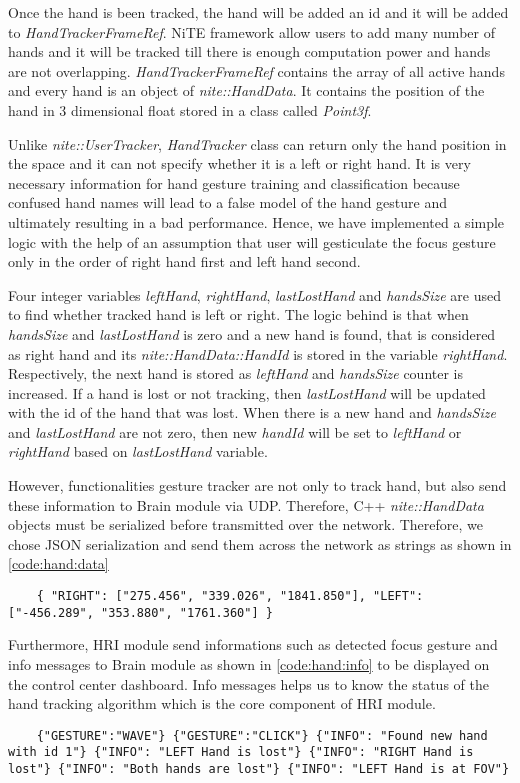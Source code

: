 Once the hand is been tracked, the hand will be added an id and it will be added to \textit{HandTrackerFrameRef}. NiTE framework allow users to add many number of hands and it will be tracked till there is enough computation power and hands are not overlapping. \textit{HandTrackerFrameRef} contains the array of all active hands and every hand is an object of \textit{nite::HandData}. It contains the position of the hand in 3 dimensional float stored in a class called \textit{Point3f}.

Unlike \textit{nite::UserTracker}, \textit{HandTracker} class can return only the hand position in the space and it can not specify whether it is a left or right hand. It is very necessary information for hand gesture training and classification because confused hand names will lead to a false model of the hand gesture and ultimately resulting in a bad performance. Hence, we have implemented a simple logic with the help of an assumption that user will gesticulate the focus gesture only in the order of right hand first and left hand second. 

Four integer variables \textit{leftHand}, \textit{rightHand}, \textit{lastLostHand} and \textit{handsSize} are used to find whether tracked hand is left or right. The logic behind is that when \textit{handsSize} and \textit{lastLostHand} is zero and a new hand is found, that is considered as right hand and its \textit{nite::HandData::HandId} is stored in the variable \textit{rightHand}. Respectively, the next hand is stored as \textit{leftHand} and \textit{handsSize} counter is increased. If a hand is lost or not tracking, then \textit{lastLostHand} will be updated with the id of the hand that was lost. When there is a new hand and \textit{handsSize} and \textit{lastLostHand} are not zero, then new \textit{handId} will be set to \textit{leftHand} or \textit{rightHand} based on \textit{lastLostHand} variable.

However, functionalities gesture tracker are not only to track hand, but also send these information to Brain module via UDP. Therefore, C++ \textit{nite::HandData} objects must be serialized before transmitted over the network. Therefore, we chose JSON serialization and send them across the network as strings as shown in \ref{code:hand:data}
\begin{lstlisting}
	{ "RIGHT": ["275.456", "339.026", "1841.850"], "LEFT": ["-456.289", "353.880", "1761.360"] } 
\end{lstlisting}
\label{code:hand:data}

Furthermore, HRI module send informations such as detected focus gesture and info messages to Brain module as shown in \ref{code:hand:info} to be displayed on the control center dashboard. Info messages helps us to know the status of the hand tracking algorithm which is the core component of HRI module. 
\begin{lstlisting}
	{"GESTURE":"WAVE"} {"GESTURE":"CLICK"} {"INFO": "Found new hand with id 1"} {"INFO": "LEFT Hand is lost"} {"INFO": "RIGHT Hand is lost"} {"INFO": "Both hands are lost"} {"INFO": "LEFT Hand is at FOV"} 
\end{lstlisting}
\label{code:hand:info}

